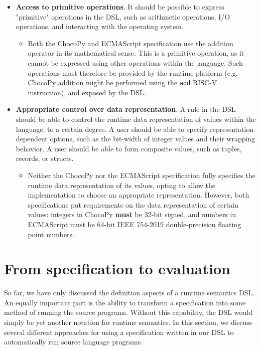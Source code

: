 \begin{itemize}
\begin{itemize}
  \end{itemize}
  \item \textbf{Access to primitive operations}. It should be possible to express "primitive" operations in the \ac{DSL}, such as arithmetic operations, I/O operations, and interacting with the operating system.
  \begin{itemize}
    \item Both the ChocoPy and ECMAScript specification use the addition operator in its mathematical sense. This is a primitive operation, as it cannot be expressed using other operations within the language. Such operations must therefore be provided by the runtime platform (e.g. ChocoPy addition might be performed using the \texttt{add} RISC-V instruction), and exposed by the \ac{DSL}.
  \end{itemize}
  \item \textbf{Appropriate control over data representation}. A rule in the \ac{DSL} should be able to control the runtime data representation of values within the language, to a certain degree. A user should be able to specify representation-dependent options, such as the bit-width of integer values and their wrapping behavior. A user should be able to form composite values, such as tuples, records, or structs.
  \begin{itemize}
    \item Neither the ChocoPy nor the ECMAScript specification fully specifies the runtime data representation of its values, opting to allow the implementation to choose an appropriate representation. However, both specifications put requirements on the data representation of certain values: integers in ChocoPy \textbf{must} be 32-bit signed, and numbers in ECMAScript must be 64-bit IEEE 754-2019 \cite{8766229} double-precision floating point numbers.
  \end{itemize}
\end{itemize}


\section{From specification to evaluation}
\label{sec:design_evaluation}
So far, we have only discussed the definition aspects of a runtime semantics \ac{DSL}. An equally important part is the ability to transform a specification into some method of running the source programs. Without this capability, the \ac{DSL} would simply be yet another notation for runtime semantics. In this section, we discuss several different approaches for using a specification written in our \ac{DSL} to automatically run source language programs. \\

